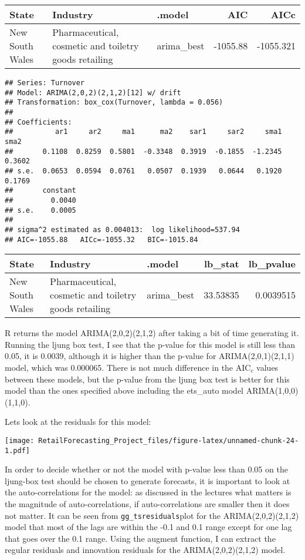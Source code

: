 \documentclass[
]{article}
\begin{document}
\begin{table}
\centering
\begin{tabular}{l|l|l|r|r}
\hline
State & Industry & .model & AIC & AICc\\
\hline
New South Wales & Pharmaceutical, cosmetic and toiletry goods retailing & arima\_best & -1055.88 & -1055.321\\
\hline
\end{tabular}
\end{table}

\begin{verbatim}
## Series: Turnover 
## Model: ARIMA(2,0,2)(2,1,2)[12] w/ drift 
## Transformation: box_cox(Turnover, lambda = 0.056) 
## 
## Coefficients:
##          ar1     ar2     ma1      ma2    sar1     sar2     sma1    sma2
##       0.1108  0.8259  0.5801  -0.3348  0.3919  -0.1855  -1.2345  0.3602
## s.e.  0.0653  0.0594  0.0761   0.0507  0.1939   0.0644   0.1920  0.1769
##       constant
##         0.0040
## s.e.    0.0005
## 
## sigma^2 estimated as 0.004013:  log likelihood=537.94
## AIC=-1055.88   AICc=-1055.32   BIC=-1015.84
\end{verbatim}

\begin{table}
\centering
\begin{tabular}{l|l|l|r|r}
\hline
State & Industry & .model & lb\_stat & lb\_pvalue\\
\hline
New South Wales & Pharmaceutical, cosmetic and toiletry goods retailing & arima\_best & 33.53835 & 0.0039515\\
\hline
\end{tabular}
\end{table}

R returns the model ARIMA(2,0,2)(2,1,2) after taking a bit of time
generating it. Running the ljung box test, I see that the p-value for
this model is still less than 0.05, it is 0.0039, although it is higher
than the p-value for ARIMA(2,0,1)(2,1,1) model, which was 0.000065.
There is not much difference in the AIC\(_c\) values between these
models, but the p-value from the ljung box test is better for this model
than the ones specified above including the ets\_auto model
ARIMA(1,0,0)(1,1,0).

Lets look at the residuals for this model:

\texttt{[image: RetailForecasting\_Project\_files/figure-latex/unnamed-chunk-24-1.pdf]}

In order to decide whether or not the model with p-value less than 0.05
on the ljung-box test should be chosen to generate forecasts, it is
important to look at the auto-correlations for the model: as discussed
in the lectures what matters is the magnitude of auto-correlations, if
auto-correlations are smaller then it does not matter. It can be seen
from \texttt{gg\_tsresiduals}plot for the ARIMA(2,0,2)(2,1,2) model that
most of the lags are within the -0.1 and 0.1 range except for one lag
that goes over the 0.1 range. Using the augment function, I can extract
the regular residuals and innovation residuals for the
ARIMA(2,0,2)(2,1,2) model.
\end{document}

